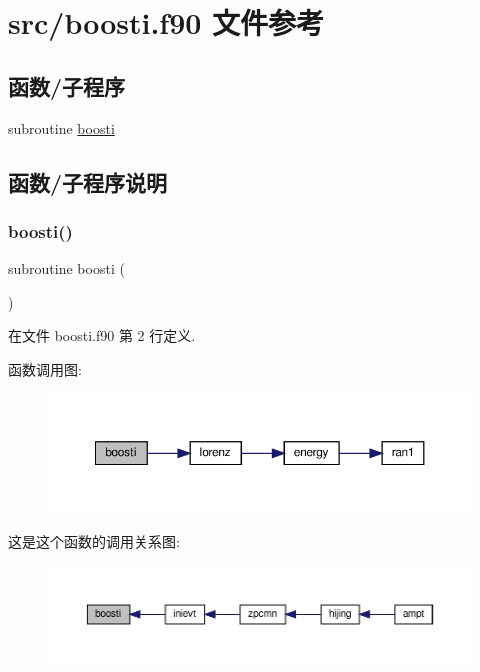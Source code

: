 \hypertarget{boosti_8f90}{}\section{src/boosti.f90 文件参考}
\label{boosti_8f90}
\subsection*{函数/子程序}
\begin{DoxyCompactItemize}
\item 
subroutine \mbox{\hyperlink{boosti_8f90_a3a112849e27b8498f8c1dcc9432736f4}{boosti}}
\end{DoxyCompactItemize}


\subsection{函数/子程序说明}
\mbox{\label{boosti_8f90_a3a112849e27b8498f8c1dcc9432736f4}} 
\subsubsection{\texorpdfstring{boosti()}{boosti()}}
{\footnotesize\ttfamily subroutine boosti (\begin{DoxyParamCaption}{ }\end{DoxyParamCaption})}



在文件 boosti.\+f90 第 2 行定义.

函数调用图\+:
\nopagebreak
\begin{figure}[H]
\begin{center}
\leavevmode
\includegraphics[width=350pt]{boosti_8f90_a3a112849e27b8498f8c1dcc9432736f4_cgraph}
\end{center}
\end{figure}
这是这个函数的调用关系图\+:
\nopagebreak
\begin{figure}[H]
\begin{center}
\leavevmode
\includegraphics[width=350pt]{boosti_8f90_a3a112849e27b8498f8c1dcc9432736f4_icgraph}
\end{center}
\end{figure}
